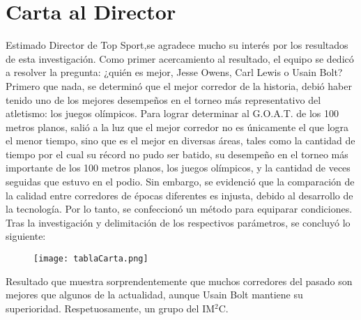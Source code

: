 \documentclass[a4paper]{article}
\begin{document}
\section{Carta al Director}
Estimado Director de Top Sport,\newline \newline se agradece mucho su interés por los resultados de esta investigación. Como primer acercamiento al resultado, el equipo se dedicó a resolver la pregunta: ¿quién es mejor, Jesse Owens, Carl Lewis o Usain Bolt? \newline\newline Primero que nada, se determinó que el mejor corredor de la historia, debió haber tenido uno de los mejores desempeños en el torneo más representativo del atletismo: los juegos olímpicos. 
\newline\newline Para lograr determinar al G.O.A.T. de los 100 metros planos, salió a la luz que el mejor corredor no es únicamente el que logra el menor tiempo, sino que es el mejor en diversas áreas, tales como la cantidad de tiempo por el cual su récord no pudo ser batido, su desempeño en el torneo más importante de los 100 metros planos, los juegos olímpicos, y la cantidad de veces seguidas que estuvo en el podio. Sin embargo, se evidenció que la comparación de la calidad entre corredores de épocas diferentes es injusta, debido al desarrollo de la tecnología. Por lo tanto, se confeccionó un método para equiparar condiciones. \newline\newline Tras la investigación y delimitación de los respectivos parámetros, se concluyó  lo siguiente: 
\begin{figure}[H]
    \begin{center}
    \texttt{[image: tablaCarta.png]}    
    \end{center}    
\end{figure} 
Resultado que muestra sorprendentemente que muchos corredores del pasado son mejores que algunos de la actualidad, aunque Usain Bolt mantiene su superioridad. \newline\newline Respetuosamente, \newline   \hfill un grupo del IM$^2$C.


\newpage
\end{document}
